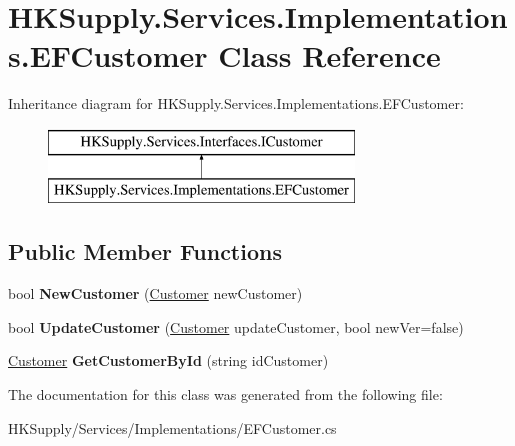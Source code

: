 \hypertarget{class_h_k_supply_1_1_services_1_1_implementations_1_1_e_f_customer}{}\section{H\+K\+Supply.\+Services.\+Implementations.\+E\+F\+Customer Class Reference}
\label{class_h_k_supply_1_1_services_1_1_implementations_1_1_e_f_customer}
Inheritance diagram for H\+K\+Supply.\+Services.\+Implementations.\+E\+F\+Customer\+:\begin{figure}[H]
\begin{center}
\leavevmode
\includegraphics[height=2.000000cm]{class_h_k_supply_1_1_services_1_1_implementations_1_1_e_f_customer}
\end{center}
\end{figure}
\subsection*{Public Member Functions}
\begin{DoxyCompactItemize}
\item 
\mbox{\label{class_h_k_supply_1_1_services_1_1_implementations_1_1_e_f_customer_a8caba8c3706d212709d73ff4e2e94e1e}} 
bool {\bfseries New\+Customer} (\hyperlink{class_h_k_supply_1_1_models_1_1_customer}{Customer} new\+Customer)
\item 
\mbox{\label{class_h_k_supply_1_1_services_1_1_implementations_1_1_e_f_customer_af7bd47be2eff71310dd5ad5e4157bfa4}} 
bool {\bfseries Update\+Customer} (\hyperlink{class_h_k_supply_1_1_models_1_1_customer}{Customer} update\+Customer, bool new\+Ver=false)
\item 
\mbox{\label{class_h_k_supply_1_1_services_1_1_implementations_1_1_e_f_customer_a88c703ed6108d30abbed42876d524fb3}} 
\hyperlink{class_h_k_supply_1_1_models_1_1_customer}{Customer} {\bfseries Get\+Customer\+By\+Id} (string id\+Customer)
\end{DoxyCompactItemize}


The documentation for this class was generated from the following file\+:\begin{DoxyCompactItemize}
\item 
H\+K\+Supply/\+Services/\+Implementations/E\+F\+Customer.\+cs\end{DoxyCompactItemize}
